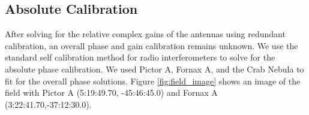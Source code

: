 \documentclass[twocolumn,numberedappendix]{emulateapj} \shorttitle{PSA64}
\begin{document}
\subsection{Absolute Calibration}\label{sec:abscal}
%

After solving for the relative complex gains of the antennas using redundant
calibration, an overall phase and gain calibration remains unknown. We use the
standard self calibration method for radio interferometers to solve for the
absolute phase calibration. We used Pictor A, Fornax A, and the Crab Nebula to
fit for the overall phase solutions. Figure \ref{fig:field_image} shows an image
of the field with Pictor A (5:19:49.70, -45:46:45.0)  and Fornax A
(3:22:41.70,-37:12:30.0).

%      
%
%
\end{document}
